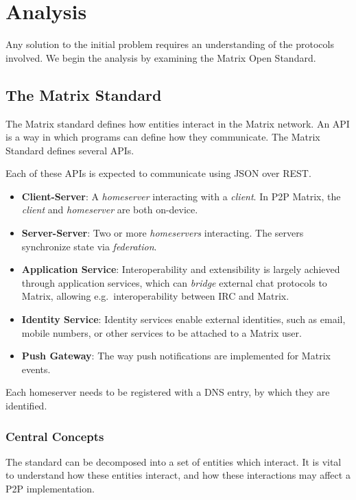 \chapter{Analysis}
Any solution to the initial problem requires an understanding of the protocols involved.
We begin the analysis by examining the Matrix Open Standard.

\section{The Matrix Standard}
The Matrix standard defines how entities interact in the Matrix network.
An \ac{API} is a way in which programs can define how they communicate.
The Matrix Standard defines several \ac{API}s.

Each of these \ac{API}s is expected to communicate using \ac{JSON} over \ac{REST}.
\begin{itemize}
	\item \textbf{Client-Server}:
	      A \textit{homeserver} interacting with a \textit{client}.
	      In \ac{P2P} Matrix, the \textit{client} and \textit{homeserver} are both on-device.
	\item \textbf{Server-Server}:
	      Two or more \textit{homeservers} interacting.
	      The servers synchronize state via \textit{federation}.
	\item \textbf{Application Service}:
	      Interoperability and extensibility is largely achieved through application services, which can \textit{bridge} external chat protocols to Matrix, allowing e.g.~interoperability between \ac{IRC} and Matrix.
	\item \textbf{Identity Service}:
	      Identity services enable external identities, such as email, mobile numbers, or other services to be attached to a Matrix user.
	\item \textbf{Push Gateway}:
	      The way push notifications are implemented for Matrix events.
\end{itemize}

Each homeserver needs to be registered with a \ac{DNS} entry, by which they are identified.

\subsection{Central Concepts}
The standard can be decomposed into a set of entities which interact.
It is vital to understand how these entities interact, and how these interactions may affect a \ac{P2P} implementation.

